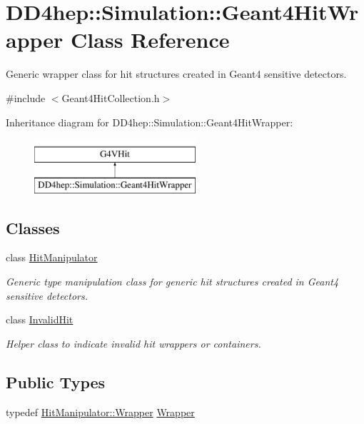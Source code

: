 \hypertarget{class_d_d4hep_1_1_simulation_1_1_geant4_hit_wrapper}{}\section{D\+D4hep\+:\+:Simulation\+:\+:Geant4\+Hit\+Wrapper Class Reference}
\label{class_d_d4hep_1_1_simulation_1_1_geant4_hit_wrapper}


Generic wrapper class for hit structures created in Geant4 sensitive detectors.  




{\ttfamily \#include $<$Geant4\+Hit\+Collection.\+h$>$}

Inheritance diagram for D\+D4hep\+:\+:Simulation\+:\+:Geant4\+Hit\+Wrapper\+:\begin{figure}[H]
\begin{center}
\leavevmode
\includegraphics[height=2.000000cm]{class_d_d4hep_1_1_simulation_1_1_geant4_hit_wrapper}
\end{center}
\end{figure}
\subsection*{Classes}
\begin{DoxyCompactItemize}
\item 
class \hyperlink{class_d_d4hep_1_1_simulation_1_1_geant4_hit_wrapper_1_1_hit_manipulator}{Hit\+Manipulator}
\begin{DoxyCompactList}\small\item\em Generic type manipulation class for generic hit structures created in Geant4 sensitive detectors. \end{DoxyCompactList}\item 
class \hyperlink{class_d_d4hep_1_1_simulation_1_1_geant4_hit_wrapper_1_1_invalid_hit}{Invalid\+Hit}
\begin{DoxyCompactList}\small\item\em Helper class to indicate invalid hit wrappers or containers. \end{DoxyCompactList}\end{DoxyCompactItemize}
\subsection*{Public Types}
\begin{DoxyCompactItemize}
\item 
typedef \hyperlink{class_d_d4hep_1_1_simulation_1_1_geant4_hit_wrapper_1_1_hit_manipulator_a4bb62cc7e4979a8d0aea281477a4e38e}{Hit\+Manipulator\+::\+Wrapper} \hyperlink{class_d_d4hep_1_1_simulation_1_1_geant4_hit_wrapper_a4779e35eba7d553e0f2d497c49a42ec6}{Wrapper}
\end{DoxyCompactItemize}
